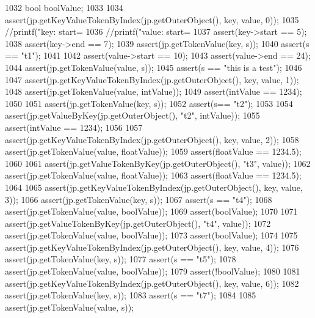 \begin{DoxyCode}
{{{{{{{{{{1032         \textcolor{keywordtype}{bool} boolValue;
1033 
1034         assert(jp.getKeyValueTokenByIndex(jp.getOuterObject(), key, value, 0));
1035         \textcolor{comment}{//printf("key: start=%
1036         \textcolor{comment}{//printf("value: start=%
1037         assert(key->start == 5);
1038         assert(key->end == 7);
1039         assert(jp.getTokenValue(key, s));
1040         assert(s == \textcolor{stringliteral}{"t1"});
1041 
1042         assert(value->start == 10);
1043         assert(value->end == 24);
1044         assert(jp.getTokenValue(value, s));
1045         assert(s == \textcolor{stringliteral}{"this is a test"});
1046 
1047         assert(jp.getKeyValueTokenByIndex(jp.getOuterObject(), key, value, 1));
1048         assert(jp.getTokenValue(value, intValue));
1049         assert(intValue == 1234);
1050 
1051         assert(jp.getTokenValue(key, s));
1052         assert(s== \textcolor{stringliteral}{"t2"});
1053 
1054         assert(jp.getValueByKey(jp.getOuterObject(), \textcolor{stringliteral}{"t2"}, intValue));
1055         assert(intValue == 1234);
1056 
1057         assert(jp.getKeyValueTokenByIndex(jp.getOuterObject(), key, value, 2));
1058         assert(jp.getTokenValue(value, floatValue));
1059         assert(floatValue == 1234.5);
1060 
1061         assert(jp.getValueTokenByKey(jp.getOuterObject(), \textcolor{stringliteral}{"t3"}, value));
1062         assert(jp.getTokenValue(value, floatValue));
1063         assert(floatValue == 1234.5);
1064 
1065         assert(jp.getKeyValueTokenByIndex(jp.getOuterObject(), key, value, 3));
1066         assert(jp.getTokenValue(key, s));
1067         assert(s == \textcolor{stringliteral}{"t4"});
1068         assert(jp.getTokenValue(value, boolValue));
1069         assert(boolValue);
1070 
1071         assert(jp.getValueTokenByKey(jp.getOuterObject(), \textcolor{stringliteral}{"t4"}, value));
1072         assert(jp.getTokenValue(value, boolValue));
1073         assert(boolValue);
1074 
1075         assert(jp.getKeyValueTokenByIndex(jp.getOuterObject(), key, value, 4));
1076         assert(jp.getTokenValue(key, s));
1077         assert(s == \textcolor{stringliteral}{"t5"});
1078         assert(jp.getTokenValue(value, boolValue));
1079         assert(!boolValue);
1080 
1081         assert(jp.getKeyValueTokenByIndex(jp.getOuterObject(), key, value, 6));
1082         assert(jp.getTokenValue(key, s));
1083         assert(s == \textcolor{stringliteral}{"t7"});
1084 
1085         assert(jp.getTokenValue(value, s));
}}}}}}}}}}}}
\end{DoxyCode}
